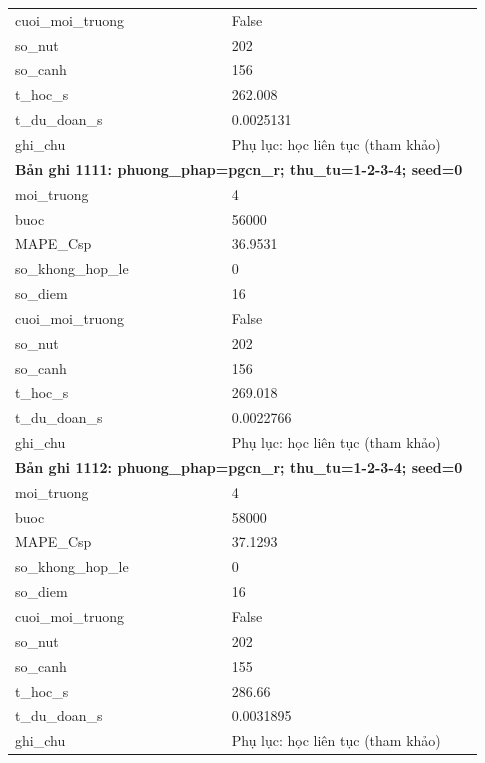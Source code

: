 \begin{longtable}{p{0.43\linewidth}p{0.50\linewidth}}
cuoi\_\allowbreak moi\_\allowbreak truong & False \\
so\_\allowbreak nut & 202 \\
so\_\allowbreak canh & 156 \\
t\_\allowbreak hoc\_\allowbreak s & 262.008 \\
t\_\allowbreak du\_\allowbreak doan\_\allowbreak s & 0.0025131 \\
ghi\_\allowbreak chu & Phụ lục: học liên tục (tham khảo) \\
\midrule
\multicolumn{2}{p{0.95\linewidth}}{\textbf{Bản ghi 1111: phuong\_phap=pgcn\_r; thu\_tu=1-2-3-4; seed=0}} \\
moi\_\allowbreak truong & 4 \\
buoc & 56000 \\
MAPE\_\allowbreak Csp & 36.9531 \\
so\_\allowbreak khong\_\allowbreak hop\_\allowbreak le & 0 \\
so\_\allowbreak diem & 16 \\
cuoi\_\allowbreak moi\_\allowbreak truong & False \\
so\_\allowbreak nut & 202 \\
so\_\allowbreak canh & 156 \\
t\_\allowbreak hoc\_\allowbreak s & 269.018 \\
t\_\allowbreak du\_\allowbreak doan\_\allowbreak s & 0.0022766 \\
ghi\_\allowbreak chu & Phụ lục: học liên tục (tham khảo) \\
\midrule
\multicolumn{2}{p{0.95\linewidth}}{\textbf{Bản ghi 1112: phuong\_phap=pgcn\_r; thu\_tu=1-2-3-4; seed=0}} \\
moi\_\allowbreak truong & 4 \\
buoc & 58000 \\
MAPE\_\allowbreak Csp & 37.1293 \\
so\_\allowbreak khong\_\allowbreak hop\_\allowbreak le & 0 \\
so\_\allowbreak diem & 16 \\
cuoi\_\allowbreak moi\_\allowbreak truong & False \\
so\_\allowbreak nut & 202 \\
so\_\allowbreak canh & 155 \\
t\_\allowbreak hoc\_\allowbreak s & 286.66 \\
t\_\allowbreak du\_\allowbreak doan\_\allowbreak s & 0.0031895 \\
ghi\_\allowbreak chu & Phụ lục: học liên tục (tham khảo) \\

\end{longtable}
